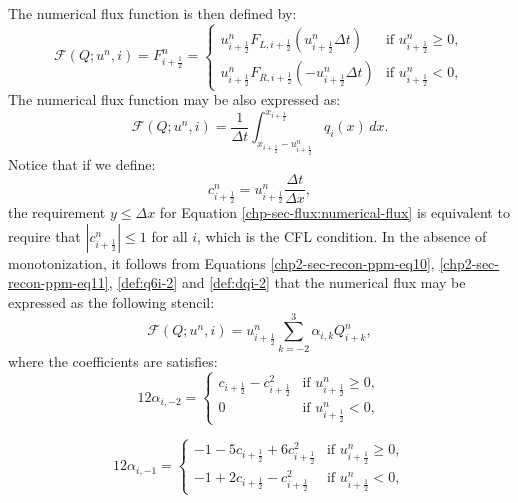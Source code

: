 The numerical flux function is then defined by:
\begin{equation}
	\label{chp-sec-flux:numerical-flux}
	\mathcal{F}(Q;u^n,i) = F_{i+\frac{1}{2}}^n =  
    	\begin{cases}
		u_{i+\frac{1}{2}}^nF_{L,i+\frac{1}{2}}( u_{i+\frac{1}{2}}^n\Delta t) & \text{if } u_{i+\frac{1}{2}}^n \geq 0,\\
		u_{i+\frac{1}{2}}^nF_{R,i+\frac{1}{2}}(-u_{i+\frac{1}{2}}^n\Delta t) & \text{if } u_{i+\frac{1}{2}}^n<0,
    	\end{cases}
\end{equation}
The numerical flux function may be also expressed as:
\begin{equation}
	\label{chp-sec-flux:numerical-flux2}
	\mathcal{F}(Q;u^n,i) =  \frac{1}{\Delta t} 
	\int_{x_{i+\frac{1}{2}}-u^n_{i+\frac{1}{2}}}^{x_{i+\frac{1}{2}}}
	q_i(x) \,dx.
\end{equation}
Notice that if we define:
\begin{equation*}
	\label{chp-sec-flux:cedges}
	c_{i+\frac{1}{2}}^n = u_{i+\frac{1}{2}}^n\frac{\Delta t}{\Delta x},
\end{equation*}
the requirement $y\leq \Delta x$ for 
Equation \eqref{chp-sec-flux:numerical-flux} is equivalent
to require that $|c^{n}_{i+\frac{1}{2}}| \leq 1$ for all $i$,  which is the CFL condition.
In the absence of monotonization, it follows from Equations
\eqref{chp2-sec-recon-ppm-eq10}, \eqref{chp2-sec-recon-ppm-eq11},
\eqref{def:q6i-2} and \eqref{def:dqi-2}
that the numerical flux may be expressed as the following stencil:
\begin{equation*}
	\label{chp-sec-flux:numerical-flux-stencil}
	\mathcal{F}(Q;u^n,i) = u_{i+\frac{1}{2}}^n
	\sum_{k=-2}^{3} \alpha_{i,k}Q_{i+k}^n,
\end{equation*}
where the coefficients are satisfies:
\begin{equation*}
	12\alpha_{i,-2} =  
    	\begin{cases}
		c_{i+\frac{1}{2}}-c_{i+\frac{1}{2}}^2 &
		\text{if } u_{i+\frac{1}{2}}^n \geq 0,\\
		0 & \text{if } u_{i+\frac{1}{2}}^n<0,
    	\end{cases}
\end{equation*}

\begin{equation*}
	12\alpha_{i,-1} =  
    	\begin{cases}
		-1 - 5c_{i+\frac{1}{2}}  + 6c_{i+\frac{1}{2}}^2 
		& \text{if } u_{i+\frac{1}{2}}^n \geq 0,\\
		-1 +  2c_{i+\frac{1}{2}}   -   c_{i+\frac{1}{2}}^2 & \text{if } u_{i+\frac{1}{2}}^n<0,
    	\end{cases}
\end{equation*}

